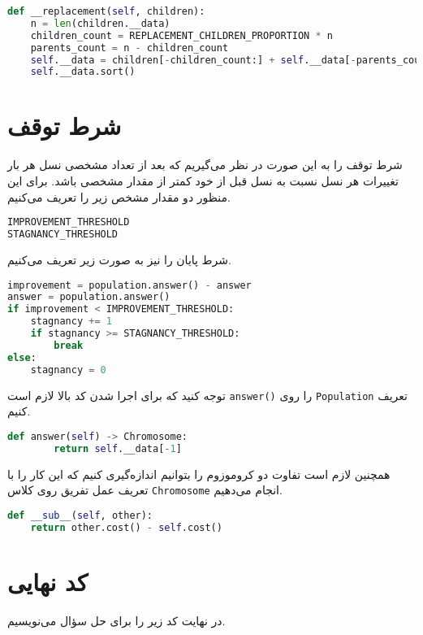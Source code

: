 \documentclass[a4paper, 12pt]{article}
\theoremstyle{definition}
\begin{document}
\LTR
\begin{lstlisting}[language=Python]
def __replacement(self, children):
    n = len(children.__data)
    children_count = REPLACEMENT_CHILDREN_PROPORTION * n
    parents_count = n - children_count
    self.__data = children[-children_count:] + self.__data[-parents_count:]
    self.__data.sort()
\end{lstlisting}
\RTL

\section{شرط توقف}
شرط توقف را به این صورت در نظر می‌گیریم که بعد از تعداد مشخصی نسل هر بار تغییرات هر نسل نسبت به نسل قبل از خود کمتر از مقدار مشخصی باشد. برای این منظور دو مقدار مشخص زیر را تعریف می‌کنیم.

\LTR
\begin{lstlisting}[language=Python]
IMPROVEMENT_THRESHOLD
STAGNANCY_THRESHOLD
\end{lstlisting}
\RTL

شرط پایان را نیز به صورت زیر تعریف می‌کنیم.

\LTR
\begin{lstlisting}[language=Python]
improvement = population.answer() - answer
answer = population.answer()
if improvement < IMPROVEMENT_THRESHOLD:
    stagnancy += 1
    if stagnancy >= STAGNANCY_THRESHOLD:
        break
else:
    stagnancy = 0
\end{lstlisting}
\RTL

توجه کنید که برای اجرا شدن کد بالا لازم است
\texttt{answer()}
را روی
\texttt{Population}
تعریف کنیم.

\LTR
\begin{lstlisting}[language=Python]
    def answer(self) -> Chromosome:
        return self.__data[-1]
\end{lstlisting}
\RTL

همچنین لازم است تفاوت دو کروموزوم را بتوانیم اندازه‌گیری کنیم که این کار را با تعریف عمل تفریق روی کلاس
\texttt{Chromosome}
انجام می‌دهیم.

\LTR
\begin{lstlisting}[language=Python]
def __sub__(self, other):
    return other.cost() - self.cost()
\end{lstlisting}
\RTL

\section{کد نهایی}
در نهایت کد زیر را برای حل سؤال می‌نویسیم.
\end{document}
